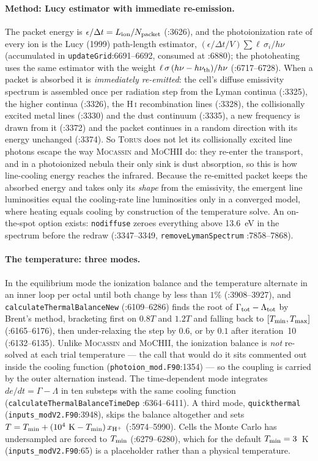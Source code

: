\documentclass[english,a4paper]{my_memo}
\newcommand{\code}[1]{\texttt{#1}}
\newcommand{\MoCHII}{\textsc{MoCHII}}
\newcommand{\Mocassin}{\textsc{Mocassin}}
\newcommand{\Torus}{\textsc{Torus}}
\newcommand{\HI}{H\,\textsc{i}}
\begin{document}
\paragraph{Method: Lucy estimator with immediate re-emission.}  The packet
energy is $\epsilon/\Delta t = L_{\rm ion}/N_{\rm packet}$ (:3626), and the
photoionization rate of every ion is
the Lucy (1999) path-length estimator, $(\epsilon/\Delta t/V)\sum \ell\,
\sigma_i/h\nu$ (accumulated in \code{updateGrid}:6691--6692, consumed at
:6880); the photoheating uses the same estimator with the weight
$\ell\,\sigma\,(h\nu - h\nu_{\rm th})/h\nu$ (:6717--6728).  When a packet is
absorbed it is \emph{immediately re-emitted}: the cell's diffuse emissivity
spectrum is assembled once per radiation step from the Lyman continua
(:3325), the higher continua (:3326), the \HI{} recombination lines (:3328),
the collisionally excited metal lines (:3330) and the dust continuum (:3335),
a new frequency is drawn from it (:3372) and the packet continues in a random
direction with its energy unchanged (:3374).  So \Torus{} does not let its
collisionally excited line photons escape the way \Mocassin{} and \MoCHII{}
do: they re-enter the transport, and in a photoionized nebula their only sink
is dust absorption, so this is how line-cooling energy reaches the infrared.
Because the re-emitted packet keeps the absorbed energy and takes only its
\emph{shape} from the emissivity, the emergent line luminosities equal the
cooling-rate line luminosities only in a converged model, where heating equals
cooling by construction of the temperature solve.  An on-the-spot option
exists: \code{nodiffuse} zeroes everything above 13.6~eV in the spectrum
before the redraw (:3347--3349, \code{removeLymanSpectrum} :7858--7868).

\paragraph{The temperature: three modes.}  In the equilibrium mode the
ionization balance and the temperature alternate in an inner loop per octal
until both change by less than $1\%$ (:3908--3927), and
\code{calculateThermalBalanceNew} (:6109--6286) finds the root of
$\Gamma_{\rm tot} - \Lambda_{\rm tot}$ by Brent's method, bracketing first on
$0.8T$ and $1.2T$ and falling back to $[T_{\rm min}, T_{\rm max}]$
(:6165--6176), then under-relaxing the step by $0.6$, or by $0.1$ after
iteration~10 (:6132--6135).  Unlike \Mocassin{} and \MoCHII{}, the ionization
balance is \emph{not} re-solved at each trial temperature --- the call that
would do it sits commented out inside the cooling function
(\code{photoion\_mod.F90}:1354) --- so the coupling is carried by the outer
alternation instead.  The time-dependent mode integrates
$de/dt = \Gamma - \Lambda$ in ten substeps with the same cooling function
(\code{calculateThermalBalanceTimeDep} :6364--6411).  A third mode,
\code{quickthermal} (\code{inputs\_modV2.F90}:3948), skips the balance
altogether and sets $T = T_{\rm min} + (10^4~{\rm K} - T_{\rm min})\,
x_{\rm H^+}$ (:5974--5990).  Cells the Monte Carlo has undersampled are forced
to $T_{\rm min}$ (:6279--6280), which for the default $T_{\rm min} = 3$~K
(\code{inputs\_modV2.F90}:65) is a placeholder rather than a physical
temperature.
\end{document}
